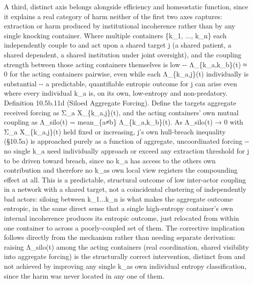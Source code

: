 \documentclass[
]{article}
\begin{document}
A third, distinct axis belongs alongside efficiency and homeostatic
function, since it explains a real category of harm neither of the first
two axes captures: extraction or harm produced by institutional
incoherence rather than by any single knocking container. Where multiple
containers \{k\_1, ..., k\_n\} each independently couple to and act upon
a shared target j (a shared patient, a shared dependent, a shared
institution under joint oversight), and the coupling strength between
those acting containers themselves is low -\/- Λ\_\{k\_a,k\_b\}(t) ≈ 0
for the acting containers pairwise, even while each Λ\_\{k\_a,j\}(t)
individually is substantial -\/- a predictable, quantifiable entropic
outcome for j can arise even where every individual k\_a is, on its own,
low-entropy and non-predatory. Definition 10.5b.11d (Siloed Aggregate
Forcing). Define the targets aggregate received forcing as Σ\_a
X\_\{k\_a,j\}(t), and the acting containers' own mutual coupling as
Λ\_silo(t) = mean\_\{a≠b\} Λ\_\{k\_a,k\_b\}(t). As Λ\_silo(t) → 0 with
Σ\_a X\_\{k\_a,j\}(t) held fixed or increasing, j's own hull-breach
inequality (§10.5a) is approached purely as a function of aggregate,
uncoordinated forcing -\/- no single k\_a need individually approach or
exceed any extraction threshold for j to be driven toward breach, since
no k\_a has access to the others own contribution and therefore no k\_as
own local view registers the compounding effect at all. This is a
predictable, structural outcome of low inter-actor coupling in a network
with a shared target, not a coincidental clustering of independently bad
actors: siloing between k\_1...k\_n is what makes the aggregate outcome
entropic, in the same direct sense that a single high-entropy container's
own internal incoherence produces its entropic outcome, just relocated
from within one container to across a poorly-coupled set of them. The
corrective implication follows directly from the mechanism rather than
needing separate derivation: raising Λ\_silo(t) among the acting
containers (real coordination, shared visibility into aggregate forcing)
is the structurally correct intervention, distinct from and not achieved
by improving any single k\_as own individual entropy classification,
since the harm was never located in any one of them.
\end{document}
